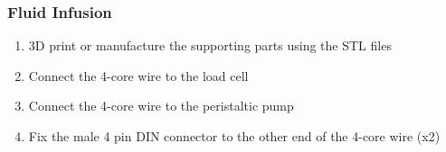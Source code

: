 \subsubsection{Fluid Infusion}

\begin{enumerate}
    \item 3D print or manufacture the supporting parts using the STL files 
    \item Connect the 4-core wire to the load cell
    \item Connect the 4-core wire to the peristaltic pump
    \item Fix the male 4 pin DIN connector to the other end of the 4-core wire (x2)
  \end{enumerate}